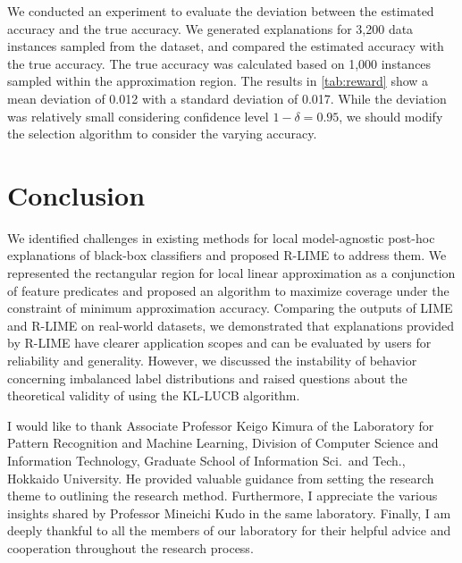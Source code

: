 \documentclass[11pt]{article}
\begin{document}
We conducted an experiment to evaluate the deviation
between the estimated accuracy and the true accuracy.
We generated explanations for 3,200 data instances sampled from the dataset,
and compared the estimated accuracy with the true accuracy.
The true accuracy was calculated based on 1,000 instances sampled
within the approximation region.
The results in \cref{tab:reward} show a mean deviation of 0.012
with a standard deviation of 0.017.
While the deviation was relatively small considering confidence level $1-\delta=0.95$,
we should modify the selection algorithm to consider the varying accuracy.

\section{Conclusion}
We identified challenges in existing methods for local model-agnostic post-hoc
explanations of black-box classifiers and proposed R-LIME to address them.
We represented the rectangular region for local linear approximation as a
conjunction of feature predicates and proposed an algorithm to
maximize coverage under the constraint of minimum approximation accuracy.
Comparing the outputs of LIME and R-LIME on real-world datasets,
we demonstrated that explanations provided by R-LIME have clearer application
scopes and can be evaluated by users for reliability and generality.
However, we discussed the instability of behavior concerning imbalanced label
distributions and raised questions about the theoretical validity of using
the KL-LUCB algorithm.

\ifnum{}
	\acknowledge
	I would like to thank Associate Professor Keigo Kimura
	of the Laboratory for Pattern Recognition and Machine Learning,
	Division of Computer Science and Information Technology,
	Graduate School of Information Sci.\ and Tech., Hokkaido University.
	He provided valuable guidance
	from setting the research theme to outlining the research method.
	Furthermore,
	I appreciate the various insights shared by Professor Mineichi Kudo
	in the same laboratory.
	Finally, I am deeply thankful to all the members of our laboratory
	for their helpful advice and cooperation throughout the research process.
\fi


%
%
%
\ifnum{}
	
\else
	
\fi

%
\end{document}
